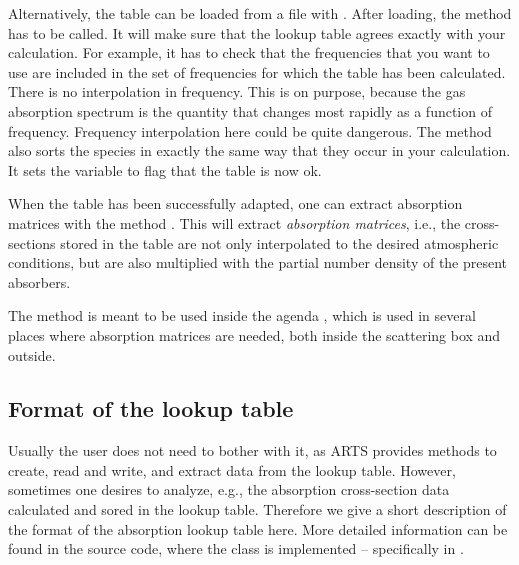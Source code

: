 Alternatively, the table can be loaded from a file with
.  After loading, the method
 has to be called. It will make sure that
the lookup table agrees exactly with your calculation. For example, it
has to check that the frequencies that you want to use are included in
the set of frequencies for which the table has been calculated.  There
is no interpolation in frequency. This is on purpose, because the gas
absorption spectrum is the quantity that changes most rapidly as a
function of frequency. Frequency interpolation here could be quite
dangerous. The  method also sorts the
species in exactly the same way that they occur in your
calculation. It sets the variable 
to flag that the table is now ok. 

When the table has been successfully adapted, one can extract
absorption matrices with the method
. This will extract
\emph{absorption matrices}, i.e., the cross-sections stored in the
table are not only interpolated to the desired atmospheric conditions,
but are also multiplied with the partial number density of the present
absorbers.

The  method is meant to
be used inside the agenda ,
which is used in several places where absorption matrices are
needed, both inside the scattering box and outside.

\subsection{Format of the lookup table}
Usually the user does not need to bother with it, as ARTS provides methods to
create, read and write, and extract data from the lookup table. However,
sometimes one desires to analyze, e.g., the absorption cross-section data
calculated and sored in the lookup table. Therefore we give a short description
of the format of the absorption lookup table here. More detailed information can
be found in the source code, where the  class is
implemented -- specifically in .

